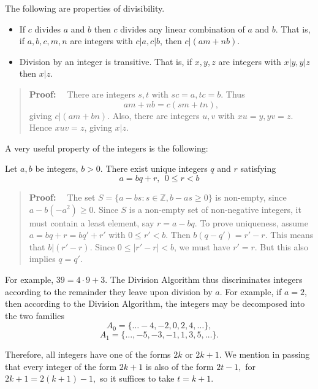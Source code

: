 \documentclass[11pt, openany]{book}
\theoremstyle{change} \theoremheaderfont{\blue\sffamily\bfseries}
\newcommand{\proofsymbol}{\Pisymbol{pzd}{113}}
\theoremstyle{nonumberplain} \theoremheaderfont{\sffamily\bfseries}
\newenvironment{pf}[0]{\itshape\begin{quote}{\bf Proof: \ }}{\proofsymbol\end{quote}}
\newcommand{\BBZ}{\mathbb{Z}}
\newcommand{\í}{\'{\i}}
\begin{document}
\begin{thm} The following are properties of divisibility.\begin{itemize}
\item If $c$ divides $a$ and $b$ then $c$ divides any linear
combination of $a$ and $b$. That is, if $a, b, c, m, n$ are
integers with $c|a, c|b$, then $c|(am + nb)$. \item Division by an
integer is transitive. That is, if $x, y, z$ are integers with
$x|y , y|z$ then $x|z$.
\end{itemize} \end{thm}
\begin{pf} There are integers $s, t$ with $sc = a, tc = b$. Thus
$$am + nb = c(sm + tn), $$giving $c|(am + bn).$ Also, there are integers $u, v$ with $xu = y, yv = z.$ Hence $xuv = z$, giving
$x|z$. \end{pf}




\par A very useful property of the integers is the following:\\

\begin{thm} Let  $a, b$ be integers, $b > 0$. There exist unique integers
 $q$ and $r$ satisfying
\begin{equation}
a = bq + r, \ \ 0 \leq r < b \end{equation}\end{thm}
\begin{pf}
The set $S = \{a - bs: s\in\BBZ, b - as \geq 0\}$ is non-empty,
since $a - b(-a^2) \geq 0$. Since $S$ is a non-empty set of
non-negative integers, it must contain a least element, say $r = a
- bq.$ To prove uniqueness, assume $a = bq + r = bq' + r'$ with $0
\leq r' < b$. Then $b(q - q') = r' - r$. This means that $b|(r' -
r)$. Since $0 \leq |r' - r| < b$, we must have $r' = r$. But this
also implies $q = q'$.
\end{pf}


For example, $39 = 4\cdot 9 + 3$. The Division Algorithm thus
discriminates integers according to the remainder they leave upon
division by $a$. For example, if $a = 2$, then according to the
Division Algorithm, the integers may be decomposed into the two
families
$$A_0 = \{  \ldots -4, -2, 0, 2, 4, \ldots \},$$
$$A_1 = \{ \ldots, -5, -3, -1, 1, 3, 5, \ldots \}.$$


Therefore, all integers have one of the forms $2k$ or $2k + 1.$ We
mention in passing that every integer of the form  $2k + 1$ is
also of the form  $2t - 1,$ for $2k + 1 = 2(k + 1) - 1,$ so it
suffices to take $t = k + 1$.
\end{document}
